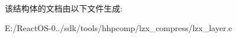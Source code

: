 该结构体的文档由以下文件生成\+:\begin{DoxyCompactItemize}
\item 
E\+:/\+React\+O\+S-\/0../sdk/tools/hhpcomp/lzx\+\_\+compress/lzx\+\_\+layer.\+c\end{DoxyCompactItemize}
